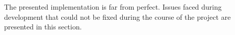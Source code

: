 The presented implementation is far from perfect.
Issues faced during development that could not be fixed during the course of the
project are presented in this section.

